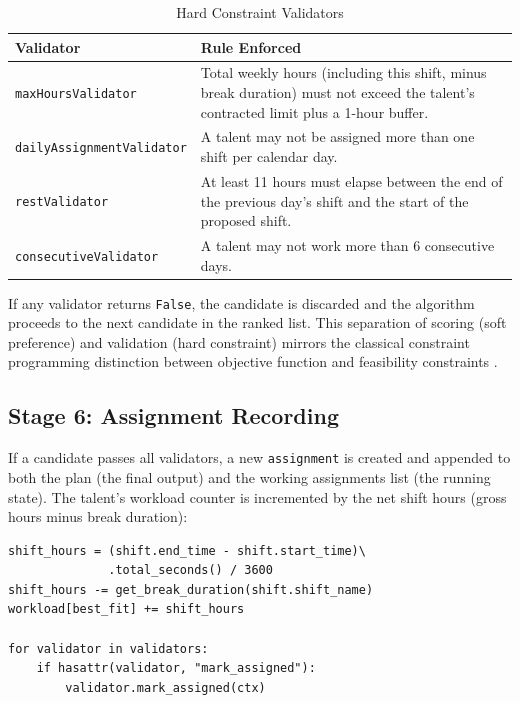 \begin{table}[H]
\centering
\caption{Hard Constraint Validators}
\label{tab:validators}
\begin{tabular}{p{4.5cm} p{8.5cm}}
\toprule
\textbf{Validator} & \textbf{Rule Enforced} \\
\midrule
\texttt{maxHoursValidator} & Total weekly hours (including this shift, minus break duration) must not exceed the talent's contracted limit plus a 1-hour buffer. \\
\texttt{dailyAssignmentValidator} & A talent may not be assigned more than one shift per calendar day. \\
\texttt{restValidator} & At least 11 hours must elapse between the end of the previous day's shift and the start of the proposed shift. \\
\texttt{consecutiveValidator} & A talent may not work more than 6 consecutive days. \\
\bottomrule
\end{tabular}
\end{table}

If any validator returns \texttt{False}, the candidate is discarded and the algorithm proceeds to the next candidate in the ranked list. This separation of scoring (soft preference) and validation (hard constraint) mirrors the classical constraint programming distinction between objective function and feasibility constraints \cite{pinedo_2016}.

\subsection{Stage 6: Assignment Recording}

If a candidate passes all validators, a new \texttt{assignment} is created and appended to both the plan (the final output) and the working assignments list (the running state). The talent's workload counter is incremented by the net shift hours (gross hours minus break duration):

\begin{lstlisting}[caption={Workload tracking and state update}, label={lst:workload}]
shift_hours = (shift.end_time - shift.start_time)\
              .total_seconds() / 3600
shift_hours -= get_break_duration(shift.shift_name)
workload[best_fit] += shift_hours

for validator in validators:
    if hasattr(validator, "mark_assigned"):
        validator.mark_assigned(ctx)
\end{lstlisting}

